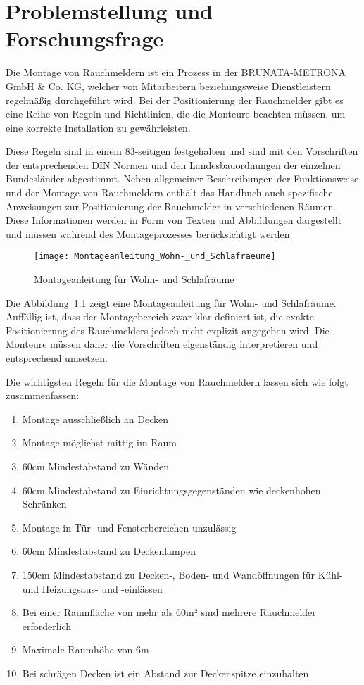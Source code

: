 \chapter{Problemstellung und Forschungsfrage} \label{cha:Problemstellung}

Die Montage von Rauchmeldern ist ein Prozess in der BRUNATA-METRONA GmbH \& Co. KG, welcher von Mitarbeitern beziehungsweise Dienstleistern regelmäßig durchgeführt wird. Bei der Positionierung der Rauchmelder gibt es eine Reihe von Regeln und Richtlinien, die die Monteure beachten müssen, um eine korrekte Installation zu gewährleisten. 

Diese Regeln sind in einem 83-seitigen \citet{brunata2023handbuch} festgehalten und sind mit den Vorschriften der entsprechenden DIN Normen und den Landesbauordnungen der einzelnen Bundesländer abgestimmt. Neben allgemeiner Beschreibungen der Funktionsweise und der Montage von Rauchmeldern enthält das Handbuch auch spezifische Anweisungen zur Positionierung der Rauchmelder in verschiedenen Räumen. Diese Informationen werden in Form von Texten und Abbildungen dargestellt und müssen während des Montageprozesses berücksichtigt werden.


\begin{figure}
\centering
\texttt{[image: Montageanleitung\_Wohn-\_und\_Schlafraeume]}
\caption{Montageanleitung für Wohn- und Schlafräume \cite{brunata2023handbuch}\label{fig:Anleitung}}\par
\end{figure}

Die Abbildung~\ref{fig:Anleitung} zeigt eine Montageanleitung für Wohn- und Schlafräume. Auffällig ist, dass der Montagebereich zwar klar definiert ist, die exakte Positionierung des Rauchmelders jedoch nicht explizit angegeben wird. Die Monteure müssen daher die Vorschriften eigenständig interpretieren und entsprechend umsetzen.

Die wichtigsten Regeln für die Montage von Rauchmeldern lassen sich wie folgt zusammenfassen:

\begin{enumerate}
    \item Montage ausschließlich an Decken
    \item Montage möglichst mittig im Raum
    \item 60cm Mindestabstand zu Wänden
    \item 60cm Mindestabstand zu Einrichtungsgegenständen wie deckenhohen Schränken
    \item Montage in Tür- und Fensterbereichen unzulässig
    \item 60cm Mindestabstand zu Deckenlampen
    \item 150cm Mindestabstand zu Decken-, Boden- und Wandöffnungen für Kühl- und Heizungsaus- und -einlässen 
    \item Bei einer Raumfläche von mehr als 60m² sind mehrere Rauchmelder erforderlich
    \item Maximale Raumhöhe von 6m
    \item Bei schrägen Decken ist ein Abstand zur Deckenspitze einzuhalten
\end{enumerate}


